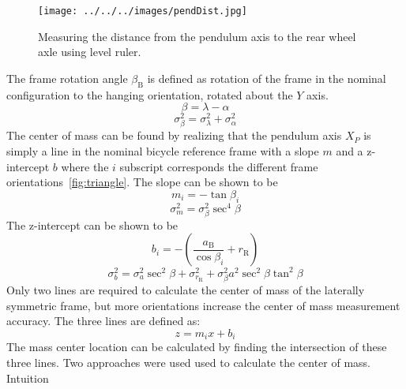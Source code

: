 \documentclass{bmd2010p}
\begin{document}
\begin{figure}[htbp]
    \begin{center}
        \texttt{[image: ../../../images/pendDist.jpg]}
    \end{center}
    \caption{Measuring the distance from the pendulum axis to the rear wheel
    axle using level ruler.}
    \label{fig:PendDist}
\end{figure}
The frame rotation angle $\beta_\mathrm{B}$ is defined as rotation of the frame in the
nominal configuration to the hanging orientation, rotated about the $Y$ axis.
\begin{equation}
    \beta=\lambda-\alpha
    \label{eq:frameRotAng}
\end{equation}
\begin{equation}
    \sigma_{\beta}^{2} = \sigma_{\lambda}^{2} + \sigma_{\alpha}^{2}
    \label{eq:FrameRotAngVar}
\end{equation}
The center of mass can be found by realizing that the pendulum axis $X_P$ is
simply a line in the nominal bicycle reference frame with a slope $m$ and a
z-intercept $b$ where the $i$ subscript corresponds the different frame
orientations~\ref{fig:triangle}. The slope can be shown to be
\begin{equation}
	m_i=-\tan{\beta_i}
\label{eq:slope}
\end{equation}
\begin{equation}
    \sigma_{m}^{2} = \sigma_{\beta}^{2}\sec^{4}{\beta}
    \label{eq:SlopeVar}
\end{equation}
The z-intercept can be shown to be
\begin{equation}
    b_i=-\left(\frac{a_\mathrm{B}}{\cos{\beta_i}}+r_\mathrm{R}\right)
    \label{eq:zInt}
\end{equation}
\begin{equation}
    \sigma_{b}^{2} = \sigma_{a}^{2}\sec^{2}{\beta} +
    \sigma_{r_\mathrm{R}}^{2} +
    \sigma_{\beta}^{2}a^{2}\sec^{2}{\beta}\tan^{2}{\beta}
    \label{eq:zIntvar}
\end{equation}
Only two lines are required to calculate the center of mass of the laterally
symmetric frame, but more orientations increase the center of mass measurement
accuracy. The three lines are defined as:
\begin{equation}
   z = m_ix+b_i
   \label{eq:line}
\end{equation}
The mass center location can be calculated by finding the intersection of these three
lines. Two approaches were used used to calculate the center of mass. Intuition
\end{document}
